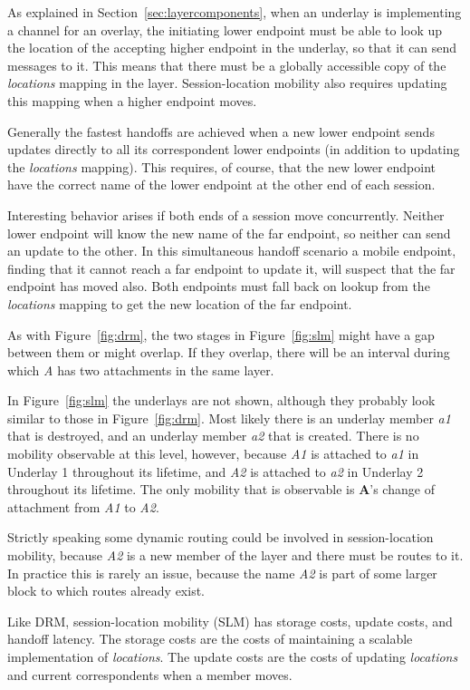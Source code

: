 As explained in Section~\ref{sec:layercomponents},
when an underlay is implementing a channel for an overlay, the initiating
lower endpoint must be able to look up the location of the 
accepting higher endpoint in the underlay, so that it can send messages
to it.
This means that there must be a globally accessible copy of the
{\it locations} mapping in the layer.
Session-location mobility also requires updating this mapping when
a higher endpoint moves.

Generally the fastest handoffs are achieved when a new lower endpoint
sends updates directly to all its correspondent lower endpoints
(in addition to updating the {\it locations} mapping).
This requires, of course, that the new lower endpoint have the 
correct name of the lower endpoint at the other end of each session.

Interesting behavior arises if both ends of a session move 
concurrently.
Neither lower endpoint will know the new name of the far endpoint,
so neither can send an update to the other.
In this simultaneous handoff
scenario a mobile endpoint, finding that it cannot reach a far
endpoint to update it, will suspect that the far endpoint has moved also.
Both endpoints must fall back on lookup from the {\it locations}
mapping to get the new location of the far endpoint.

As with Figure~\ref{fig:drm}, the two stages in Figure~\ref{fig:slm}
might have a gap between them or might overlap.
If they overlap, there will be an interval during which {\it A}
has two attachments in the same layer.

In Figure~\ref{fig:slm} the underlays are not shown,
although they probably look similar to those in Figure~\ref{fig:drm}.
Most likely there is an underlay member
{\it a1} that is destroyed, 
and an underlay member {\it a2} that is created.
There is no mobility observable at this level, however, because 
{\it A1} is attached to {\it a1} in Underlay 1 throughout its lifetime, and
{\it A2} is attached to {\it a2} in Underlay 2 throughout its lifetime.
The only mobility that is observable is {\bf A}'s change of attachment
from {\it A1} to {\it A2}.

Strictly speaking some dynamic routing could be involved in
session-location mobility, because
{\it A2} is a new member of the layer and there must be routes to it.
In practice this is rarely an issue, because the name
{\it A2} is part of some
larger block to which routes already exist.

Like DRM, session-location mobility (SLM) has storage costs,
update costs, and handoff latency.
The storage costs are the costs of maintaining a 
scalable implementation of {\it locations}.
The update costs are the costs of updating {\it locations} and
current correspondents when a member moves.


